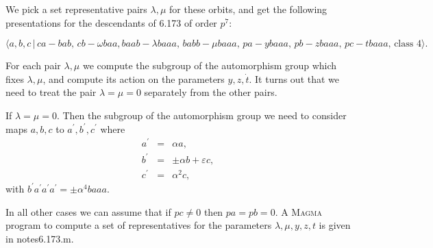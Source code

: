\documentclass[12pt]{article}
\begin{document}
We pick a set representative pairs $\lambda ,\mu $ for these orbits, and get
the following presentations for the descendants of 6.173 of order $p^{7}$:

\[
\langle a,b,c\,|\,ca-bab,\,cb-\omega baa,baab-\lambda baaa,\,babb-\mu
baaa,\,pa-ybaaa,\,pb-zbaaa,\,pc-tbaaa,\,\text{class }4\rangle .
\]

For each pair $\lambda ,\mu $ we compute the subgroup of the automorphism
group which fixes $\lambda ,\mu $, and compute its action on the parameters $%
y,z,\dot{t}$. It turns out that we need to treat the pair $\lambda =\mu =0$
separately from the other pairs.

If $\lambda =\mu =0$. Then the subgroup of the automorphism group we need to
consider maps $a,b,c$ to $a^{\prime },b^{\prime },c^{\prime }$ where 
\begin{eqnarray*}
a^{\prime } &=&\alpha a, \\
b^{\prime } &=&\pm \alpha b+\varepsilon c, \\
c^{\prime } &=&\alpha ^{2}c,
\end{eqnarray*}%
with $b^{\prime }a^{\prime }a^{\prime }a^{\prime }=\pm \alpha ^{4}baaa$.

In all other cases we can assume that if $pc\neq 0$ then $pa=pb=0$. A 
\textsc{Magma} program to compute a set of representatives for the
parameters $\lambda ,\mu ,y,z,t$ is given in notes6.173.m.
\end{document}
